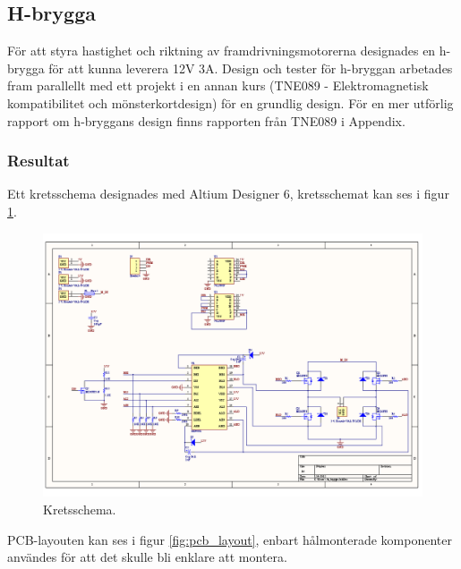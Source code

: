 \subsection{H-brygga}
För att styra hastighet och riktning av framdrivningsmotorerna designades en h-brygga för att kunna leverera 12V 3A. Design och tester för h-bryggan arbetades fram parallellt med ett projekt i en annan kurs (TNE089 - Elektromagnetisk kompatibilitet och mönsterkortdesign) för en grundlig design. För en mer utförlig rapport om h-bryggans design finns rapporten från TNE089 i Appendix.

\subsubsection{Resultat}
Ett kretsschema designades med Altium Designer 6, kretsschemat kan ses i figur \ref{fig:h_brygga_schema}.

\begin{landscape}
\begin{figure}[htbp!]
\centering
\includegraphics[width=20cm]{../../includes/figures/h_brygga_schematic}
\caption{Kretsschema.}
\label{fig:h_brygga_schema}
\end{figure}
\end{landscape}

PCB-layouten kan ses i figur \ref{fig:pcb_layout}, enbart hålmonterade komponenter användes för att det skulle bli enklare att montera.


